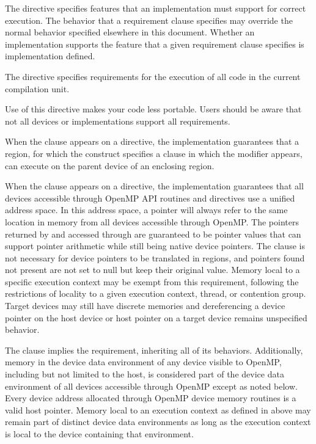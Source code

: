 \descr

The  directive specifies features that an implementation must
support for correct execution. The behavior that a requirement clause specifies
may override the normal behavior specified elsewhere in this document. Whether 
an implementation supports the feature that a given requirement clause specifies 
is implementation defined.

The  directive specifies requirements for the execution of all
code in the current compilation unit.

\begin{note}
Use of this directive makes your code less portable. Users should be aware that not all
devices or implementations support all requirements.
\end{note}

When the  clause appears on a  directive, the
implementation guarantees that a  region, for which the 
construct specifies a  clause in which the  modifier appears,
can execute on the parent device of an enclosing  region.

When the  clause appears on a 
directive, the implementation guarantees that all devices accessible through
OpenMP API routines and directives use a unified address space. In this
address space, a pointer will always refer to the same location in memory
from all devices accessible through OpenMP.  The pointers returned by
 and accessed through  are
guaranteed to be pointer values that can support pointer arithmetic while
still being native device pointers. The  clause is not
necessary for device pointers to be translated in  regions, and
pointers found not present are not set to null but keep their original value.
Memory local to a specific execution context may be exempt from this requirement,
following the restrictions of locality to a given execution context, thread, or
contention group.  Target devices may still have discrete memories and
dereferencing a device pointer on the host device or host pointer on a target
device remains unspecified behavior.

The  clause implies the 
requirement, inheriting all of its behaviors.  Additionally, memory in the
device data environment of any device visible to OpenMP, including but not
limited to the host, is considered part of the device data environment of all
devices accessible through OpenMP except as noted below.  Every device address
allocated through OpenMP device memory routines is a valid host pointer. Memory
local to an execution context as defined in  above may remain
part of distinct device data environments as long as the execution context is
local to the device containing that environment.

